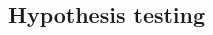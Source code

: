 \begin{spacing}{1.5}

\section[Hypothesis testing]{Hypothesis testing} %
\label{hypothesisTesting}



\end{spacing}
